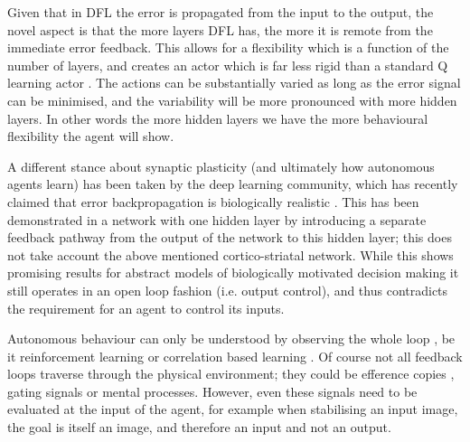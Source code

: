 \documentclass{aamas2018}
\begin{document}
Given that in DFL the error is propagated from the input to the
output, the novel aspect is that the more layers DFL has, the more it
is remote from the immediate error feedback. This allows for
a flexibility which is a function of the number of layers, and
creates an actor which is far less rigid than a standard Q learning
actor \cite{Dayan1992}. The actions can be substantially varied as
long as the error signal can be minimised, and the variability will be
more pronounced with more hidden layers. In other words the more
hidden layers we have the more behavioural flexibility the agent will
show.

A different stance about synaptic plasticity (and ultimately how
autonomous agents learn) has been taken by the deep learning
community, which has recently claimed that error backpropagation is
biologically realistic \cite{Lillicrap2016,Roelfsema2018}. This has
been demonstrated in a network with one hidden layer by introducing a
separate feedback pathway from the output of the network to this
hidden layer; this does not take account the above mentioned
cortico-striatal network. While this shows promising results for
abstract models of biologically motivated decision making it still
operates in an open loop fashion (i.e. output control), and thus
contradicts the requirement for an agent to control its inputs.

Autonomous behaviour can only be understood by observing the whole
loop \cite{Porr2005kyb}, be it reinforcement learning \cite{Sutton98}
or correlation based learning \cite{Verschure91}. Of course not all
feedback loops traverse through the physical environment; they could
be efference copies \cite{Uexkuell26,Graesser86}, gating signals or
mental processes. However, even these signals need to be evaluated at
the input of the agent, for example when stabilising an input image,
the goal is itself an image, and therefore an input and not an output.




\end{document}
